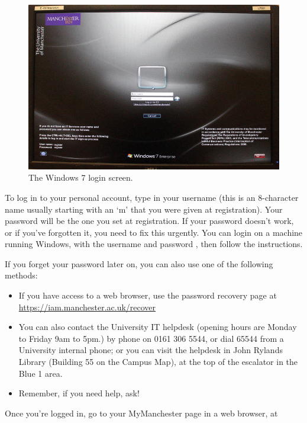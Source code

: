 \begin{figure}
\centerline{\includegraphics[width=15cm]{images/TH-win-login}}
\caption{The Windows 7 login screen.}
\label{figure:login-screen}
\end{figure}

To log in to your personal account, type in your username (this is an
8-character name usually starting with an `m' that you were given at registration). Your password will
be the one  you set at registration. If your password doesn't work, or if you've forgotten it,
you need to fix this urgently. You can login on a machine running Windows,  with the username  and password , then follow the instructions.

If you forget your password later on, you can also use one of the following methods:
\begin{itemize}
\item If you have access to a web browser, use the password recovery page at\\ \url{https://iam.manchester.ac.uk/recover}
\item You can also contact the University IT helpdesk (opening hours are Monday to Friday 9am to 5pm.) by phone on 0161 306 5544, or dial 65544 from a University internal phone; or you can visit the helpdesk in John Rylands Library (Building 55 on
the Campus Map), at the top of the escalator in the Blue 1 area.
\item Remember, if you need help, ask!
\end{itemize}

Once you're logged in, go to your MyManchester page in a web browser, at

